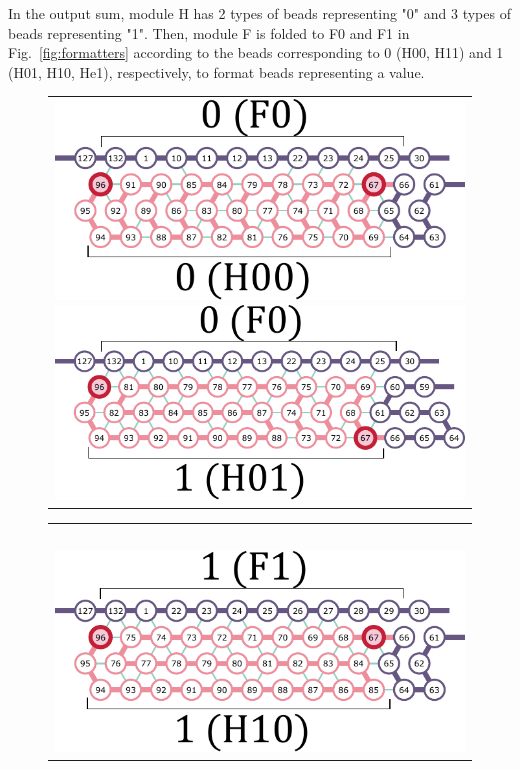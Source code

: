 \documentclass[runningheads]{llncs}
\begin{document}
In the output sum, module H has 2 types of beads representing "0" and  3 types of beads representing "1".
Then, module F is folded to F0 and F1 in Fig.~\ref{fig:formatters} according to the beads corresponding to 0 (H00, H11) and 1 (H01, H10, He1), respectively, to format beads representing a value.
\begin{figure}[h]
\begin{tabular}{c}
 \begin{minipage}{0.5\linewidth}
  \centering
   \includegraphics[width=0.6\linewidth]{fig/svg/H00_1.pdf}
 \end{minipage}
 
 \begin{minipage}{0.5\linewidth}
  \centering
   \includegraphics[width=0.6\linewidth]{fig/svg/H01_1.pdf}

 \end{minipage}
 \end{tabular}

\begin{tabular}{c}
\ \\
 \begin{minipage}{0.33\linewidth}
  \centering
   \includegraphics[width=0.9\linewidth]{fig/svg/H10_1.pdf}
 \end{minipage}
 

\end{tabular}
\end{figure}
\end{document}
